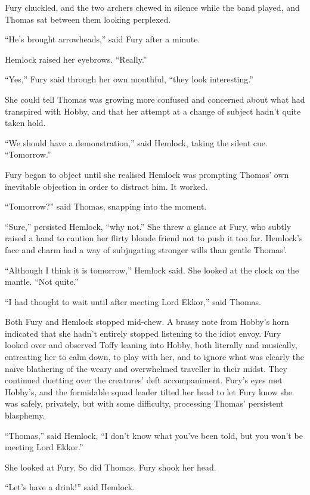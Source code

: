 \documentclass[11pt,a5paper]{article}
\begin{document}
Fury chuckled, and the two archers chewed in silence while the band played, and Thomas sat between them looking perplexed.

``He's brought arrowheads,'' said Fury after a minute.

Hemlock raised her eyebrows. ``Really.''

``Yes,'' Fury said through her own mouthful, ``they look interesting.''

She could tell Thomas was growing more confused and concerned about what had transpired with Hobby, and that her attempt at a change of subject hadn't quite taken hold.

``We should have a demonstration,'' said Hemlock, taking the silent cue. ``Tomorrow.''

Fury began to object until she realised Hemlock was prompting Thomas' own inevitable objection in order to distract him. It worked.

``Tomorrow?'' said Thomas, snapping into the moment.

``Sure,'' persisted Hemlock, ``why not.'' She threw a glance at Fury, who subtly raised a hand to caution her flirty blonde friend not to push it too far. Hemlock's face and charm had a way of subjugating stronger wills than gentle Thomas'.

``Although I think it is tomorrow,'' Hemlock said. She looked at the clock on the mantle. ``Not quite.''

``I had thought to wait until after meeting Lord Ekkor,'' said Thomas.

Both Fury and Hemlock stopped mid-chew. A brassy note from Hobby's horn indicated that she hadn't entirely stopped listening to the idiot envoy. Fury looked over and observed Toffy leaning into Hobby, both literally and musically, entreating her to calm down, to play with her, and to ignore what was clearly the naïve blathering of the weary and overwhelmed traveller in their midst. They continued duetting over the creatures' deft accompaniment. Fury's eyes met Hobby's, and the formidable squad leader tilted her head to let Fury know she was safely, privately, but with some difficulty, processing Thomas' persistent blasphemy.

``Thomas,'' said Hemlock, ``I don't know what you've been told, but you won't be meeting Lord Ekkor.''

She looked at Fury. So did Thomas. Fury shook her head.

``Let's have a drink!'' said Hemlock.

\newpage
\end{document}
